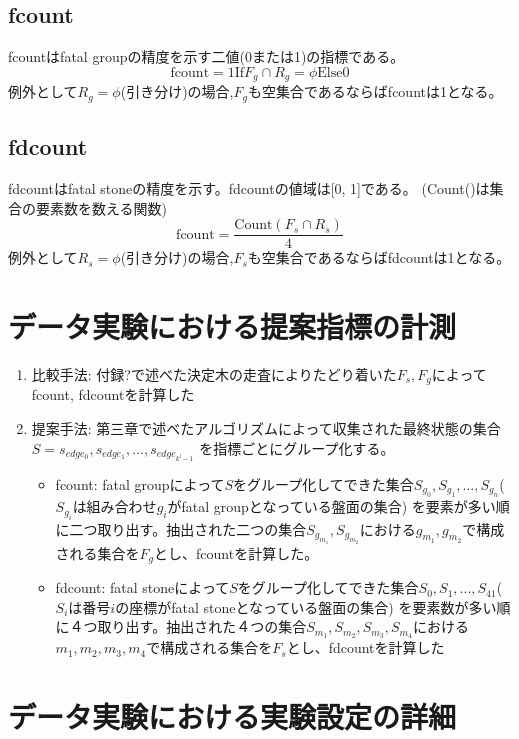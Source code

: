 \subsection{fcount}
fcountはfatal groupの精度を示す二値(0または1)の指標である。
\begin{equation}
	{\textrm{fcount} = 1 \textrm{If} F_g \cap R_g = \phi \textrm{Else} 0}
\end{equation}
例外として$R_g=\phi$(引き分け)の場合,$F_g$も空集合であるならばfcountは1となる。
\subsection{fdcount}
fdcountはfatal stoneの精度を示す。fdcountの値域は[0, 1]である。
(Count()は集合の要素数を数える関数)
\begin{equation}
	{\textrm{fcount} = \frac{\textrm{Count}(F_s \cap R_s)}{4}  }
\end{equation}
例外として$R_s=\phi$(引き分け)の場合,$F_s$も空集合であるならばfdcountは1となる。
\section{データ実験における提案指標の計測}

\begin{enumerate}
	\item 比較手法: 付録?で述べた決定木の走査によりたどり着いた$F_s, F_g$によってfcount, fdcountを計算した
	\item 提案手法: 第三章で述べたアルゴリズムによって収集された最終状態の集合$S={s_{edge_0}, s_{edge_1}, ..., s_{edge_{k^l-1}}}$
	    を指標ごとにグループ化する。
		\begin{itemize}
			\item fcount: fatal groupによって$S$をグループ化してできた集合${S_{g_0}, S_{g_1}, ..., S_{g_n}}$($S_{g_i}$は組み合わせ$g_i$がfatal groupとなっている盤面の集合)
			を要素が多い順に二つ取り出す。抽出された二つの集合${S_{g_{m_1}}, S_{g_{m_2}}}$における${g_{m_1}, g_{m_2}}$で構成される集合を$F_g$とし、fcountを計算した。
			\item fdcount: fatal stoneによって$S$をグループ化してできた集合${S_0, S_1, ..., S_41}$($S_i$は番号$i$の座標がfatal stoneとなっている盤面の集合)
			を要素数が多い順に４つ取り出す。抽出された４つの集合${S_{m_1}, S_{m_2}, S_{m_3}, S_{m_4}}$における${m_1, m_2, m_3, m_4}$で構成される集合を$F_s$とし、fdcountを計算した
		\end{itemize}
\end{enumerate}

\section{データ実験における実験設定の詳細}


